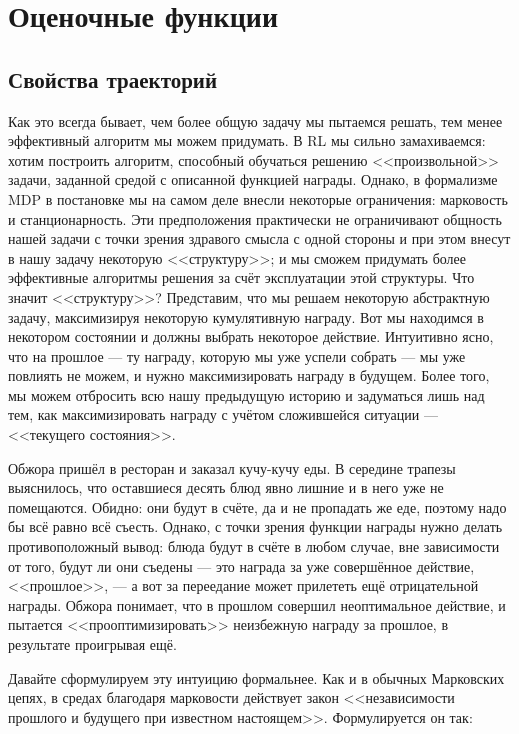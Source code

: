 \section{Оценочные функции}\label{valuefunctionssection}

\subsection{Свойства траекторий}

Как это всегда бывает, чем более общую задачу мы пытаемся решать, тем менее эффективный алгоритм мы можем придумать. В RL мы сильно замахиваемся: хотим построить алгоритм, способный обучаться решению <<произвольной>> задачи, заданной средой с описанной функцией награды. Однако, в формализме MDP в постановке мы на самом деле внесли некоторые ограничения: марковость и станционарность. Эти предположения практически не ограничивают общность нашей задачи с точки зрения здравого смысла с одной стороны и при этом внесут в нашу задачу некоторую <<структуру>>; и мы сможем придумать более эффективные алгоритмы решения за счёт эксплуатации этой структуры. Что значит <<структуру>>? Представим, что мы решаем некоторую абстрактную задачу, максимизируя некоторую кумулятивную награду. Вот мы находимся в некотором состоянии и должны выбрать некоторое действие. Интуитивно ясно, что на прошлое --- ту награду, которую мы уже успели собрать --- мы уже повлиять не можем, и нужно максимизировать награду в будущем. Более того, мы можем отбросить всю нашу предыдущую историю и задуматься лишь над тем, как максимизировать награду с учётом сложившейся ситуации --- <<текущего состояния>>. 

\begin{example}
Обжора пришёл в ресторан и заказал кучу-кучу еды. В середине трапезы выяснилось, что оставшиеся десять блюд явно лишние и в него уже не помещаются. Обидно: они будут в счёте, да и не пропадать же еде, поэтому надо бы всё равно всё съесть. Однако, с точки зрения функции награды нужно делать противоположный вывод: блюда будут в счёте в любом случае, вне зависимости от того, будут ли они съедены --- это награда за уже совершённое действие, <<прошлое>>, --- а вот за переедание может прилететь ещё отрицательной награды. Обжора понимает, что в прошлом совершил неоптимальное действие, и пытается <<прооптимизировать>> неизбежную награду за прошлое, в результате проигрывая ещё.
\end{example}

Давайте сформулируем эту интуицию формальнее. Как и в обычных Марковских цепях, в средах благодаря марковости действует закон <<независимости прошлого и будущего при известном настоящем>>. Формулируется он так: 

